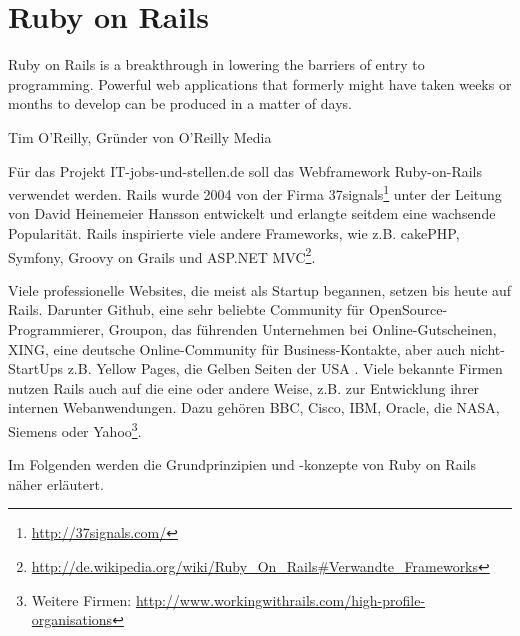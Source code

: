 \newpage

\section{Ruby on Rails}
\label{sec:rails}
\epigraph{Ruby on Rails is a breakthrough in lowering the barriers of entry to programming. Powerful web applications that formerly might have taken weeks or months to develop can be produced in a matter of days.}{Tim O'Reilly, Gründer von O'Reilly Media}


Für das Projekt IT-jobs-und-stellen.de soll das Webframework Ruby-on-Rails verwendet werden. Rails wurde 2004 von der Firma 37signals\footnote{\url{http://37signals.com/}} unter der Leitung von David Heinemeier Hansson entwickelt und erlangte seitdem eine wachsende Popularität. Rails inspirierte viele andere Frameworks, wie z.B. cakePHP, Symfony, Groovy on Grails und ASP.NET MVC\footnote{\url{http://de.wikipedia.org/wiki/Ruby_On_Rails#Verwandte_Frameworks}}.

Viele professionelle Websites, die meist als Startup begannen, setzen bis heute auf Rails. Darunter Github, eine sehr beliebte Community für OpenSource-Programmierer,  Groupon, das führenden Unternehmen bei Online-Gutscheinen, XING, eine deutsche Online-Community für Business-Kontakte, aber auch nicht-StartUps z.B. Yellow Pages, die Gelben Seiten der USA \citep{ruby_on_rails_2011}. Viele bekannte Firmen nutzen Rails auch auf die eine oder andere Weise, z.B. zur Entwicklung ihrer internen Webanwendungen. Dazu gehören BBC, Cisco, IBM, Oracle, die NASA, Siemens oder Yahoo\footnote{Weitere Firmen: \url{http://www.workingwithrails.com/high-profile-organisations}}.

Im Folgenden werden die Grundprinzipien und -konzepte von Ruby on Rails näher erläutert.

